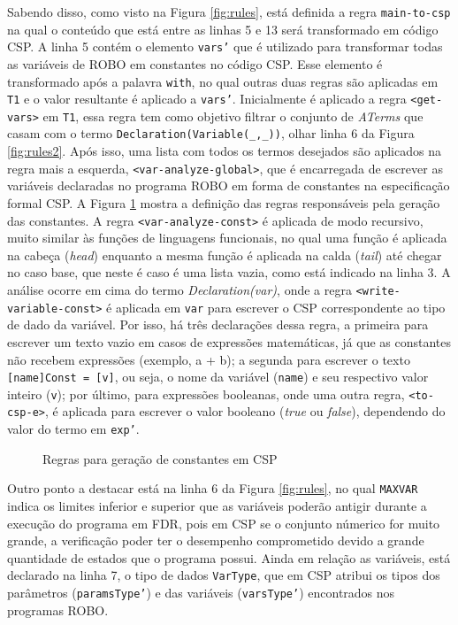 Sabendo disso, como visto na Figura \ref{fig:rules}, está definida a regra \texttt{main-to-csp} na qual o conteúdo que está entre as linhas 5 e 13 será transformado em código CSP. A linha 5 contém o elemento \texttt{vars'} que é utilizado para transformar todas as variáveis de ROBO em constantes no código CSP. Esse elemento é transformado após a palavra \texttt{with}, no qual outras duas regras são aplicadas em \texttt{T1} e o valor resultante é aplicado a \texttt{vars'}. Inicialmente é aplicado a regra \texttt{<get-vars>} em \texttt{T1}, essa regra tem como objetivo filtrar o conjunto de \textit{ATerms} que casam com o termo \texttt{Declaration(Variable(\_,\_))}, olhar linha 6 da Figura \ref{fig:rules2}. Após isso, uma lista com todos os termos desejados são aplicados na regra mais a esquerda, \texttt{<var-analyze-global>}, que é encarregada de escrever as variáveis declaradas no programa ROBO em forma de constantes na especificação formal CSP. A Figura \ref{fig:rules_constants} mostra a definição das regras responsáveis pela geração das constantes. A regra \texttt{<var-analyze-const>} é aplicada de modo recursivo, muito similar às funções de linguagens funcionais, no qual uma função é aplicada na cabeça (\textit{head}) enquanto a mesma função é aplicada na calda (\textit{tail}) até chegar no caso base, que neste é caso é uma lista vazia, como está indicado na linha 3. A análise ocorre em cima do termo \textit{Declaration(var)}, onde a regra \texttt{<write-variable-const>} é aplicada em \texttt{var} para escrever o CSP correspondente ao tipo de dado da variável. Por isso, há três declarações dessa regra, a primeira para escrever um texto vazio em casos de expressões matemáticas, já que as constantes não recebem expressões (exemplo, a + b); a segunda para escrever o texto \texttt{[name]Const = [v]}, ou seja, o nome da variável (\texttt{name}) e seu respectivo valor inteiro (\texttt{v}); por último, para expressões booleanas, onde uma outra regra, \texttt{<to-csp-e>}, é aplicada para escrever o valor booleano (\textit{true} ou \textit{false}), dependendo do valor do termo em \texttt{exp'}.

\begin{figure}[h]
\centering
\caption{Regras para geração de constantes em CSP}

\label{fig:rules_constants}
\end{figure}

Outro ponto a destacar está na linha 6 da Figura \ref{fig:rules}, no qual \texttt{MAXVAR} indica os limites inferior e superior que as variáveis poderão antigir durante a execução do programa em FDR, pois em CSP se o conjunto númerico for muito grande, a verificação poder ter o desempenho comprometido devido a grande quantidade de estados que o programa possui. Ainda em relação as variáveis, está declarado na linha 7, o tipo de dados \texttt{VarType}, que em CSP atribui os tipos dos parâmetros (\texttt{paramsType'}) e das variáveis (\texttt{varsType'}) encontrados nos programas ROBO.

